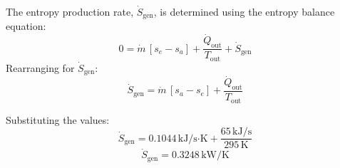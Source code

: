 The entropy production rate, \( \dot{S}_{\text{gen}} \), is determined using the entropy balance equation:  
\[
0 = \dot{m} \, [s_e - s_a] + \frac{\dot{Q}_{\text{out}}}{T_{\text{out}}} + \dot{S}_{\text{gen}}
\]  
Rearranging for \( \dot{S}_{\text{gen}} \):  
\[
\dot{S}_{\text{gen}} = \dot{m} \, [s_a - s_e] + \frac{\dot{Q}_{\text{out}}}{T_{\text{out}}}
\]  

Substituting the values:  
\[
\dot{S}_{\text{gen}} = 0.1044 \, \text{kJ/s·K} + \frac{65 \, \text{kJ/s}}{295 \, \text{K}}
\]  
\[
\dot{S}_{\text{gen}} = 0.3248 \, \text{kW/K}
\]